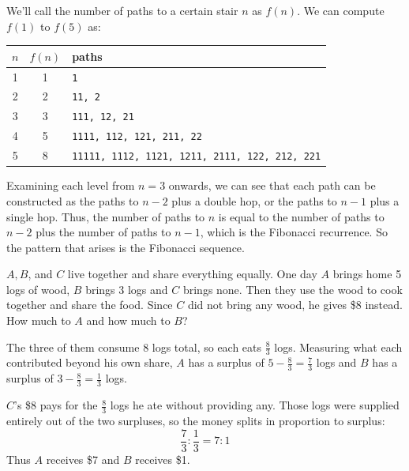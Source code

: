 \begin{solution}
We'll call the number of paths to a certain stair $n$ as $f(n)$. We can compute $f(1)$ to $f(5)$ as:

\begin{center}
\begin{tabular}{c c l}
\hline
$n$ & $f(n)$ & paths \\
\hline
1 & 1 & \texttt{1} \\
2 & 2 & \texttt{11, 2} \\
3 & 3 & \texttt{111, 12, 21} \\
4 & 5 & \texttt{1111, 112, 121, 211, 22} \\
5 & 8 & \texttt{11111, 1112, 1121, 1211, 2111, 122, 212, 221} \\
\hline
\end{tabular}
\end{center}

\vspace{1em}

Examining each level from $n=3$ onwards, we can see that each path can be constructed as the paths to $n-2$ plus a double hop, or the paths to $n-1$ plus a single hop. Thus, the number of paths to $n$ is equal to the number of paths to $n-2$ plus the number of paths to $n-1$, which is the Fibonacci recurrence. So the pattern that arises is the Fibonacci
sequence.

\end{solution}


\begin{problem}
$A, B$, and $C$ live together and share everything equally. One day $A$ brings home 5 logs of wood, $B$ brings 3 logs and $C$ brings none. Then they use the wood to cook together and share the food. Since $C$ did not bring any wood, he gives \$8 instead. How much to $A$ and how much to $B$?
\end{problem}

\begin{solution}
The three of them consume $8$ logs total, so each eats $\frac{8}{3}$ logs.
Measuring what each contributed beyond his own share, $A$ has a surplus of
$5 - \frac{8}{3} = \frac{7}{3}$ logs and $B$ has a surplus of
$3 - \frac{8}{3} = \frac{1}{3}$ logs.

$C$'s \$8 pays for the $\frac{8}{3}$ logs he ate without providing any. Those
logs were supplied entirely out of the two surpluses, so the money splits in
proportion to surplus:
\[
  \frac{7}{3} : \frac{1}{3} = 7 : 1
\]
Thus $A$ receives \$7 and $B$ receives \$1.
\end{solution}

